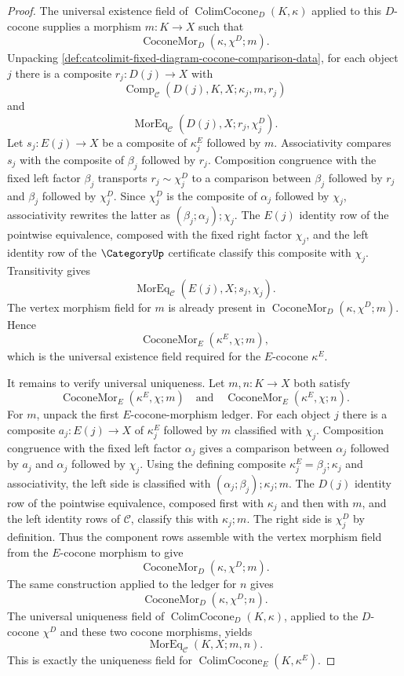 \begin{proof}
The universal existence field of $\operatorname{ColimCocone}_{D}(K,\kappa)$ applied to this $D$-cocone supplies a morphism $m:K\to X$ such that
$$
\operatorname{CoconeMor}_{D}(\kappa,\chi^D;m).
$$
Unpacking \autoref{def:catcolimit-fixed-diagram-cocone-comparison-data}, for each object $j$ there is a composite $r_j:D(j)\to X$ with
$$
\operatorname{Comp}_{\mathcal C}(D(j),K,X;\kappa_j,m,r_j)
$$
and
$$
\operatorname{MorEq}_{\mathcal C}(D(j),X;r_j,\chi^D_j).
$$
Let $s_j:E(j)\to X$ be a composite of $\kappa^E_j$ followed by $m$. Associativity compares $s_j$ with the composite of $\beta_j$ followed by $r_j$. Composition congruence with the fixed left factor $\beta_j$ transports $r_j\sim\chi^D_j$ to a comparison between $\beta_j$ followed by $r_j$ and $\beta_j$ followed by $\chi^D_j$. Since $\chi^D_j$ is the composite of $\alpha_j$ followed by $\chi_j$, associativity rewrites the latter as $(\beta_j;\alpha_j);\chi_j$. The $E(j)$ identity row of the pointwise equivalence, composed with the fixed right factor $\chi_j$, and the left identity row of the $\CategoryUp$ certificate classify this composite with $\chi_j$. Transitivity gives
$$
\operatorname{MorEq}_{\mathcal C}(E(j),X;s_j,\chi_j).
$$
The vertex morphism field for $m$ is already present in $\operatorname{CoconeMor}_{D}(\kappa,\chi^D;m)$. Hence
$$
\operatorname{CoconeMor}_{E}(\kappa^E,\chi;m),
$$
which is the universal existence field required for the $E$-cocone $\kappa^E$.

It remains to verify universal uniqueness. Let $m,n:K\to X$ both satisfy
$$
\operatorname{CoconeMor}_{E}(\kappa^E,\chi;m)
\quad\text{and}\quad
\operatorname{CoconeMor}_{E}(\kappa^E,\chi;n).
$$
For $m$, unpack the first $E$-cocone-morphism ledger. For each object $j$ there is a composite $a_j:E(j)\to X$ of $\kappa^E_j$ followed by $m$ classified with $\chi_j$. Composition congruence with the fixed left factor $\alpha_j$ gives a comparison between $\alpha_j$ followed by $a_j$ and $\alpha_j$ followed by $\chi_j$. Using the defining composite $\kappa^E_j=\beta_j;\kappa_j$ and associativity, the left side is classified with $(\alpha_j;\beta_j);\kappa_j;m$. The $D(j)$ identity row of the pointwise equivalence, composed first with $\kappa_j$ and then with $m$, and the left identity rows of $\mathcal C$, classify this with $\kappa_j;m$. The right side is $\chi^D_j$ by definition. Thus the component rows assemble with the vertex morphism field from the $E$-cocone morphism to give
$$
\operatorname{CoconeMor}_{D}(\kappa,\chi^D;m).
$$
The same construction applied to the ledger for $n$ gives
$$
\operatorname{CoconeMor}_{D}(\kappa,\chi^D;n).
$$
The universal uniqueness field of $\operatorname{ColimCocone}_{D}(K,\kappa)$, applied to the $D$-cocone $\chi^D$ and these two cocone morphisms, yields
$$
\operatorname{MorEq}_{\mathcal C}(K,X;m,n).
$$
This is exactly the uniqueness field for $\operatorname{ColimCocone}_{E}(K,\kappa^E)$.
\end{proof}

